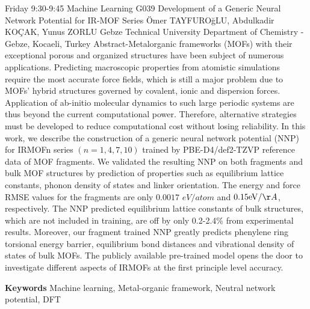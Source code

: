 
    \begin{abstract_basarim}
    {Friday 9:30-9:45}
    {Machine Learning}
    {G039}
    {Development of a Generic Neural Network Potential for IR-MOF Series}
    {%
    Ömer TAYFUROğLU, Abdulkadir KOÇAK, Yunus ZORLU}
    {%
    }
    {%
    Gebze Technical University Department of Chemistry - Gebze, Kocaeli, Turkey}
    Abstract-Metalorganic frameworks (MOFs) with their exceptional porous and organized structures have been subject of numerous applications. Predicting macroscopic properties from atomistic simulations require the most accurate force fields, which is still a major problem due to MOFs' hybrid structures governed by covalent, ionic and dispersion forces. Application of ab-initio molecular dynamics to such large periodic systems are thus beyond the current computational power. Therefore, alternative strategies must be developed to reduce computational cost without losing reliability. In this work, we describe the construction of a generic neural network potential (NNP) for IRMOFn series $(n=1,4,7,10)$ trained by PBE-D4/def2-TZVP reference data of MOF fragments. We validated the resulting NNP on both fragments and bulk MOF structures by prediction of properties such as equilibrium lattice constants, phonon density of states and linker orientation. The energy and force RMSE values for the fragments are only $0.0017$ $e V / a t o m$ and $0.15 \mathrm{eV} / \AA$, respectively. The NNP predicted equilibrium lattice constants of bulk structures, which are not included in training, are off by only 0.2-2.4\% from experimental results. Moreover, our fragment trained NNP greatly predicts phenylene ring torsional energy barrier, equilibrium bond distances and vibrational density of states of bulk MOFs. The publicly available pre-trained model opens the door to investigate different aspects of IRMOFs at the first principle level accuracy. 
    
        \textbf{Keywords} \newline{}Machine learning, Metal-organic framework, Neutral network potential, DFT
    \end{abstract_basarim}
    